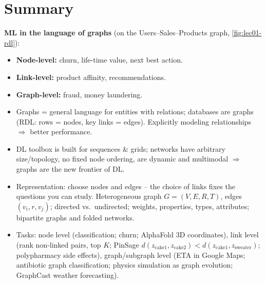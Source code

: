 \par\vspace{0pt plus 6\baselineskip}\vspace{0pt plus -6\baselineskip}
\section{Summary}\label{sec:lec01-summary}

\textbf{ML in the language of graphs} (on the Users--Sales--Products graph,
\cref{fig:lec01-rdl}):
\begin{itemize}
  \item \textbf{Node-level:} churn, life-time value, next best action.
  \item \textbf{Link-level:} product affinity, recommendations.
  \item \textbf{Graph-level:} fraud, money laundering.
\end{itemize}

\bigskip{}
{}
\begin{summarybox}
  \begin{itemize}
    \item Graphs = general language for entities with relations; databases are graphs
      (RDL: rows = nodes, key links = edges). Explicitly modeling relationships
      $\Rightarrow$ better performance.
    \item DL toolbox is built for sequences \& grids; networks have arbitrary size/topology,
      no fixed node ordering, are dynamic and multimodal $\Rightarrow$ graphs are the new
      frontier of DL.
    \item Representation: choose nodes and edges -- the choice of links fixes the questions
      you can study. Heterogeneous graph $G=(V,E,R,T)$, edges $(v_i,r,v_j)$; directed vs.\
      undirected; weights, properties, types, attributes; bipartite graphs and folded
      networks.
    \item Tasks: node level (classification; churn; AlphaFold 3D coordinates), link level
      (rank non-linked pairs, top $K$; PinSage
      $d(z_{\text{cake1}},z_{\text{cake2}})<d(z_{\text{cake1}},z_{\text{sweater}})$;
      polypharmacy side effects), graph/subgraph level (ETA in Google Maps; antibiotic
      graph classification; physics simulation as graph evolution; GraphCast weather forecasting).
  \end{itemize}
\end{summarybox}
